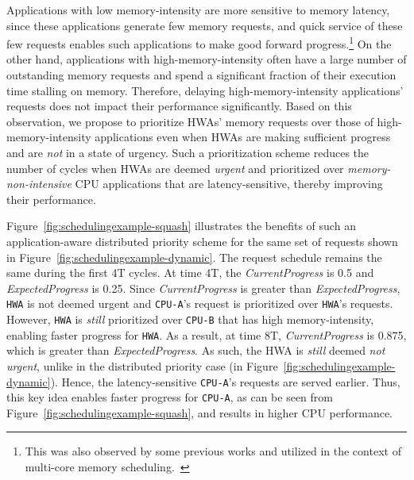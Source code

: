 \documentclass[10pt,letterpaper]{article}
\newcommand{\ca}[0]{\texttt{CPU-A}\xspace}
\newcommand{\cb}[0]{\texttt{CPU-B}\xspace}
\newcommand{\hwa}[0]{\texttt{HWA}\xspace}
\begin{document}
Applications with low memory-intensity are more sensitive to memory latency,
since these applications generate few memory requests, and quick service of
these few requests enables such applications to make good forward
progress.\footnote{This was also observed by some previous works and utilized in
the context of multi-core memory scheduling.~\cite{atlas,tcm}} On the other
hand, applications with high-memory-intensity often have a large number of
outstanding memory requests and spend a significant fraction of their execution
time stalling on memory. Therefore, delaying high-memory-intensity
applications' requests does not impact their performance significantly. Based on
this observation, we propose to prioritize HWAs' memory requests over those of
high-memory-intensity applications even when HWAs are making sufficient progress
and are \emph{not} in a state of urgency. Such a prioritization scheme reduces
the number of cycles when HWAs are deemed \emph{urgent} and prioritized over
\emph{memory-non-intensive} CPU applications that are latency-sensitive, thereby
improving their performance.

Figure~\ref{fig:schedulingexample-squash} illustrates the benefits of such an
application-aware distributed priority scheme for the same set of requests shown
in Figure~\ref{fig:schedulingexample-dynamic}. The request schedule remains the
same during the first 4T cycles. At time 4T, the {\it CurrentProgress} is 0.5
and {\it ExpectedProgress} is 0.25. Since {\it CurrentProgress} is greater than
{\it ExpectedProgress}, \hwa is not deemed urgent and \ca's request is
prioritized over \hwa's requests. However, \hwa is \emph{still} prioritized over
\cb that has high memory-intensity, enabling faster progress for \hwa. As a
result, at time 8T, {\it CurrentProgress} is 0.875, which is greater than {\it
ExpectedProgress}. As such, the HWA is \emph{still} deemed \emph{not urgent},
unlike in the distributed priority case (in
Figure~\ref{fig:schedulingexample-dynamic}). Hence, the latency-sensitive \ca's
requests are served earlier. Thus, this key idea enables faster progress for
\ca, as can be seen from Figure~\ref{fig:schedulingexample-squash}, and results
in higher CPU performance.
\end{document}
